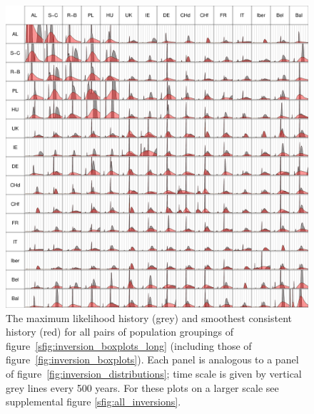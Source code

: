 \documentclass{article}
\begin{document}
\begin{figure}[!htp]
  \begin{center}
    \includegraphics{tinyinversions}
    \caption{
    The maximum likelihood history (grey) and smoothest consistent history (red)
    for all pairs of population groupings of figure~\ref{sfig:inversion_boxplots_long} 
    (including those of figure~\ref{fig:inversion_boxplots}).
    Each panel is analogous to a panel of figure~\ref{fig:inversion_distributions};
    time scale is given by vertical grey lines every 500 years.
    For these plots on a larger scale see supplemental figure \ref{sfig:all_inversions}.
    \label{sfig:tinyinversions}
    }
  \end{center}
\end{figure}
\end{document}
